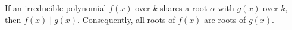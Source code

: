 If an irreducible polynomial $f(x)$ over $k$ shares a root $\alpha$ with $g(x)$ over $k$, then $f(x) \mid g(x)$. Consequently, all roots of $f(x)$ are roots of $g(x)$.
